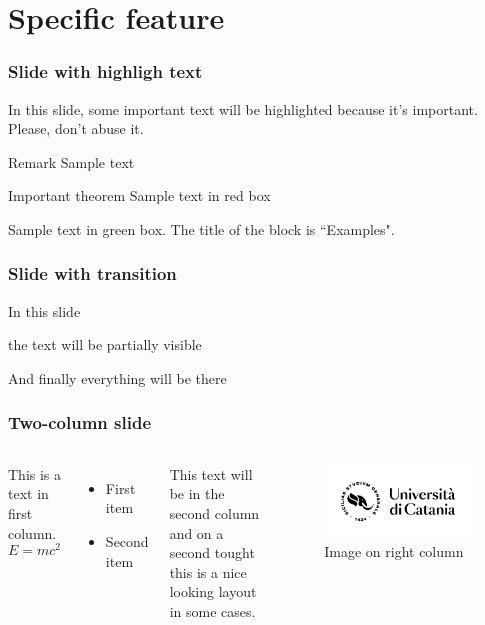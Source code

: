 \section{Specific feature}
\begin{frame}
\frametitle{Slide with highligh text}

In this slide, some important text will be
\alert{highlighted} because it's important.
Please, don't abuse it.

\begin{block}{Remark}
Sample text
\end{block}

\begin{alertblock}{Important theorem}
Sample text in red box
\end{alertblock}

\begin{examples}
Sample text in green box. The title of the block is ``Examples".
\end{examples}
\end{frame}
\begin{frame}
\frametitle{Slide with transition}
In this slide \pause

the text will be partially visible \pause

And finally everything will be there
\end{frame}


\begin{frame}
\frametitle{Two-column slide}

\begin{columns}

This is a text in first column.
$$E=mc^2$$
\begin{itemize}
\item First item
\item Second item
\end{itemize}

This text will be in the second column
and on a second tought this is a nice looking
layout in some cases.
   \begin{figure}[h]
       \centering
       \includegraphics[scale=0.1]{img/logo_v2.png}
       \caption{Image on right column}
       \label{fig:right_side}
   \end{figure}
\end{columns}
\end{frame}

